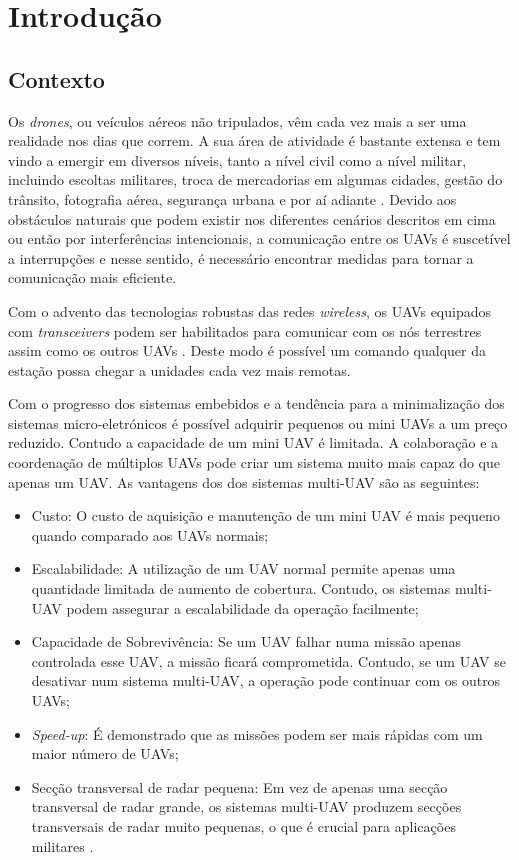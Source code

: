 \chapter{Introdução} \label{chap:intro}

\section{Contexto} \label{sec:context}

Os \textit{drones}, ou veículos aéreos não tripulados, vêm cada vez mais a ser uma realidade nos dias que correm. A sua área de atividade é bastante extensa e tem vindo a emergir em diversos níveis, tanto a nível civil como a nível militar, incluindo escoltas militares, troca de mercadorias em algumas cidades, gestão do trânsito, fotografia aérea, segurança urbana e por aí adiante \cite{8255738}. Devido aos obstáculos naturais que podem existir nos diferentes cenários descritos em cima ou então por interferências intencionais, a comunicação entre os UAVs é suscetível a interrupções \cite{Secinti2018} e nesse sentido, é necessário encontrar medidas para tornar a comunicação mais eficiente.

Com o advento das tecnologias robustas das redes \textit{wireless}, os UAVs equipados com \textit{transceivers} podem ser habilitados para comunicar com os nós terrestres assim como os outros UAVs \cite{Morgenthaler2012a}. Deste modo é possível um comando qualquer da estação possa chegar a unidades cada vez mais remotas.

Com o progresso dos sistemas embebidos e a tendência para a minimalização dos sistemas micro-eletrónicos é possível adquirir pequenos ou mini UAVs a um preço reduzido. Contudo a capacidade de um mini UAV é limitada. A colaboração e a coordenação de múltiplos UAVs pode criar um sistema muito mais capaz do que apenas um UAV. As vantagens dos dos sistemas multi-UAV são as seguintes:
  \begin{itemize}
    \item{Custo: O custo de aquisição e manutenção de um mini UAV é mais pequeno quando comparado aos UAVs normais;}
    \item {Escalabilidade: A utilização de um UAV normal permite apenas uma quantidade limitada de aumento de cobertura. Contudo, os sistemas multi-UAV podem assegurar a escalabilidade da operação facilmente; }
    \item{ Capacidade de Sobrevivência: Se um UAV falhar numa missão apenas controlada esse UAV, a missão ficará comprometida. Contudo, se um UAV se desativar num sistema multi-UAV, a operação pode continuar com os outros UAVs;}
    \item{\textit{Speed-up}: É demonstrado que as missões podem ser mais rápidas com um maior número de UAVs;}
    \item{ Secção transversal de radar pequena: Em vez de apenas uma secção transversal de radar grande, os sistemas multi-UAV produzem secções transversais de radar muito pequenas, o que é crucial para aplicações militares \cite{Bekmezci2013a}.}
  \end{itemize}
  
